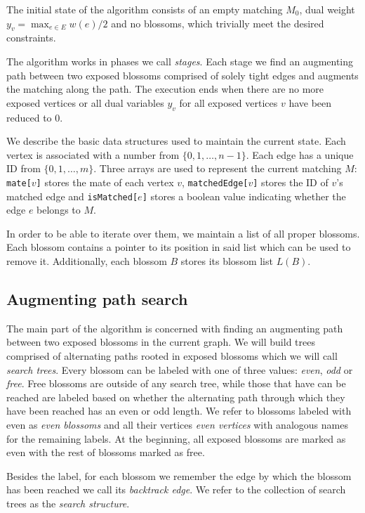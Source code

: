 The initial state of the algorithm consists of an empty matching $M_0$, dual weight $y_v = \max_{e \in E} w(e)/2$ and no blossoms, which trivially meet the desired constraints.

The algorithm works in phases we call \emph{stages}. Each stage we find an augmenting path between two exposed blossoms comprised of solely tight edges and augments the matching along the path. The execution ends when there are no more exposed vertices or all dual variables $y_v$ for all exposed vertices $v$ have been reduced to $0$.

We describe the basic data structures used to maintain the current state. Each vertex is associated with a number from $\{0, 1, \dots, n-1\}$. Each edge has a unique ID from $\{0, 1, \dots, m\}$. Three arrays are used to represent the current matching $M$: \texttt{mate[$v$]} stores the mate of each vertex $v$, \texttt{matchedEdge[$v$]} stores the ID of $v$'s matched edge and \texttt{isMatched[$e$]} stores a boolean value indicating whether the edge $e$ belongs to $M$. 

In order to be able to iterate over them, we maintain a list of all proper blossoms. Each blossom contains a pointer to its position in said list which can be used to remove it. Additionally, each blossom $B$ stores its blossom list $L(B)$.

\subsection{Augmenting path search}

The main part of the algorithm is concerned with finding an augmenting path between two exposed blossoms in the current graph. We will build trees comprised of alternating paths rooted in exposed blossoms which we will call \emph{search trees}. Every blossom can be labeled with one of three values: \emph{even}, \emph{odd} or \emph{free}. Free blossoms are outside of any search tree, while those that have can be reached are labeled based on whether the alternating path through which they have been reached has an even or odd length. We refer to blossoms labeled with even as \emph{even blossoms} and all their vertices \emph{even vertices} with analogous names for the remaining labels. At the beginning, all exposed blossoms are marked as even with the rest of blossoms marked as free.

Besides the label, for each blossom we remember the edge by which the blossom has been reached we call its \emph{backtrack edge}. We refer to the collection of search trees as the \emph{search structure}.

